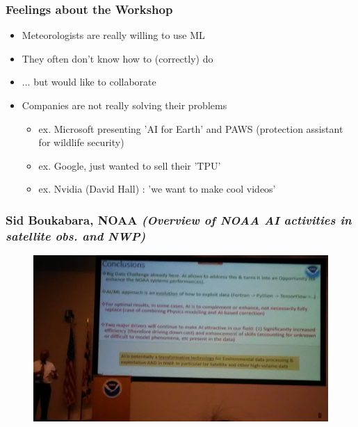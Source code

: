 \documentclass{beamer}
\begin{document}
\begin{frame}
\frametitle{Feelings about the Workshop}

\begin{itemize}
	\item Meteorologists are really willing to use ML
	\item They often don't know how to (correctly) do
	\item ... but would like to collaborate
	\item Companies are not really solving their problems
		\begin{itemize}
			\item ex. Microsoft presenting 'AI for Earth' and PAWS (protection assistant for wildlife security)
			\item ex. Google, just wanted to sell their 'TPU'
			\item ex. Nvidia (David Hall) : 'we want to make cool videos' 
		\end{itemize}
\end{itemize}
\end{frame}

\begin{frame}
\frametitle{Sid Boukabara, NOAA \textit{(Overview of NOAA AI activities in satellite obs. and NWP)}}
\begin{figure}
	\includegraphics[width=\linewidth]{figs/P_20190423_111607.jpg}
\end{figure}
\end{frame}
\end{document}
